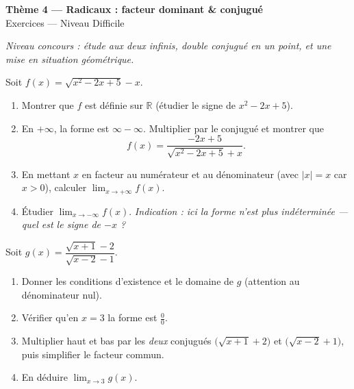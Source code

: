 \documentclass[11pt,a4paper]{article}
\newcommand{\R}{\mathbb{R}}
\begin{document}
\begin{center}
{\Large\bfseries\color{primarydark}Thème 4 — Radicaux : facteur dominant \& conjugué}\\[2pt]
{\large\color{primary}Exercices — Niveau Difficile}
\end{center}
\vspace{4pt}
{\small\itshape Niveau concours : étude aux deux infinis, double conjugué en un point, et une mise en
situation géométrique.}
\vspace{6pt}

\begin{exercice}
Soit $f(x)=\sqrt{x^2-2x+5}-x$.
\begin{enumerate}[label=\alph*),leftmargin=2em,itemsep=3pt]
  \item Montrer que $f$ est définie sur $\R$ (étudier le signe de $x^2-2x+5$).
  \item En $+\infty$, la forme est $\infty-\infty$. Multiplier par le conjugué et montrer que
        \[ f(x)=\frac{-2x+5}{\sqrt{x^2-2x+5}+x}. \]
  \item En mettant $x$ en facteur au numérateur et au dénominateur (avec $|x|=x$ car $x>0$), calculer
        $\displaystyle\lim_{x\to+\infty} f(x)$.
  \item Étudier $\displaystyle\lim_{x\to-\infty} f(x)$. \emph{Indication : ici la forme n'est plus indéterminée
        — quel est le signe de $-x$ ?}
\end{enumerate}
\end{exercice}

\begin{exercice}
Soit $g(x)=\dfrac{\sqrt{x+1}-2}{\sqrt{x-2}-1}$.
\begin{enumerate}[label=\alph*),leftmargin=2em,itemsep=3pt]
  \item Donner les conditions d'existence et le domaine de $g$ (attention au dénominateur nul).
  \item Vérifier qu'en $x=3$ la forme est $\frac00$.
  \item Multiplier haut et bas par les \emph{deux} conjugués $\bigl(\sqrt{x+1}+2\bigr)$ et
        $\bigl(\sqrt{x-2}+1\bigr)$, puis simplifier le facteur commun.
  \item En déduire $\displaystyle\lim_{x\to 3} g(x)$.
\end{enumerate}
\end{exercice}
\end{document}
